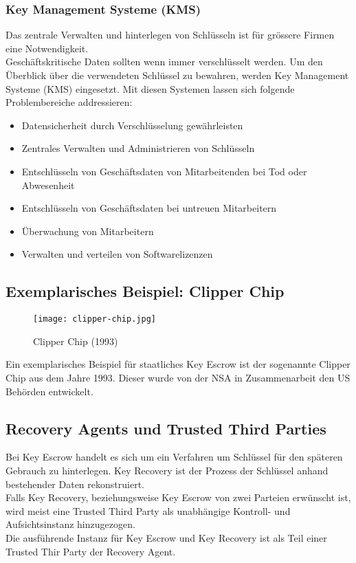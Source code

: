 	\subsubsection{Key Management Systeme (KMS)}
Das zentrale Verwalten und hinterlegen von Schlüsseln ist für grössere Firmen eine Notwendigkeit. \\
Geschäftskritische Daten sollten wenn immer verschlüsselt werden. Um den Überblick über die verwendeten Schlüssel zu bewahren, werden Key Management Systeme (KMS) eingesetzt.
Mit diesen Systemen lassen sich folgende Problembereiche addressieren:
\begin{itemize}
	\item Datensicherheit durch Verschlüsselung gewährleisten
	\item Zentrales Verwalten und Administrieren von Schlüsseln
	\item Entschlüsseln von Geschäftsdaten von Mitarbeitenden bei Tod oder Abwesenheit
	\item Entschlüsseln von Geschäftsdaten bei untreuen Mitarbeitern
  \item Überwachung von Mitarbeitern
  \item Verwalten und verteilen von Softwarelizenzen
\end{itemize}
	

	
	\subsection{Exemplarisches Beispiel: Clipper Chip}
\begin{figure}[H]
	\centering
	\texttt{[image: clipper-chip.jpg]}
	\caption{Clipper Chip (1993)}
	\label{fig:clipper-chip}
\end{figure}
Ein exemplarisches Beispiel für staatliches Key Escrow ist der sogenannte Clipper Chip aus dem Jahre 1993. Dieser wurde von der NSA in Zusammenarbeit den US Behörden entwickelt.


	\subsection{Recovery Agents und Trusted Third Parties}
Bei Key Escrow handelt es sich um ein Verfahren um Schlüssel für den späteren Gebrauch zu hinterlegen. Key Recovery ist der Prozess der Schlüssel anhand bestehender Daten rekonstruiert.
\\
Falls Key Recovery, beziehungsweise Key Escrow von zwei Parteien erwünscht ist, wird meist eine Trusted Third Party als unabhängige Kontroll- und Aufsichtsinstanz hinzugezogen.
\\
Die ausführende Instanz für Key Escrow und Key Recovery ist als Teil einer Trusted Thir Party der Recovery Agent.
